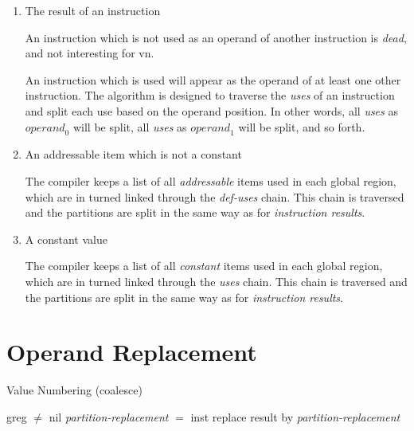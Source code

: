 \begin{enumerate}
\item The result of an instruction

  An instruction which is not used as an operand of another
  instruction is \emph{dead}, and not interesting for \ac{vn}.

  An instruction which is used will appear as the operand of at least
  one other instruction.  The algorithm is designed to traverse the
  \emph{uses} of an instruction and split each use based on the
  operand position.  In other words, all \emph{uses} as ${operand}_0$
  will be split, all \emph{uses} as ${operand}_1$ will be split, and
  so forth.

\item An addressable item which is not a constant

  The compiler keeps a list of all \emph{addressable} items used in
  each global region, which are in turned linked through the
  \emph{def-uses} chain.  This chain is traversed and the partitions
  are split in the same way as for \emph{instruction results}.

\item A constant value

  The compiler keeps a list of all \emph{constant} items used in each
  global region, which are in turned linked through the \emph{uses}
  chain.  This chain is traversed and the partitions are split in the
  same way as for \emph{instruction results}.

\end{enumerate}

\section{Operand Replacement}

\begin{algorithm}[h!]
  \caption{Value Numbering (coalesce)}
  \begin{algorithmic}[1]
    \REQUIRE greg $\neq$ nil
          \STATE \emph{partition-replacement} $=$ inst
        \ELSE
               \STATE replace result by \emph{partition-replacement}
             \ENDFOR
          \ENDFOR
        \ENDIF
      \ENDFOR
    \ENDFOR
  \end{algorithmic}
\end{algorithm}

